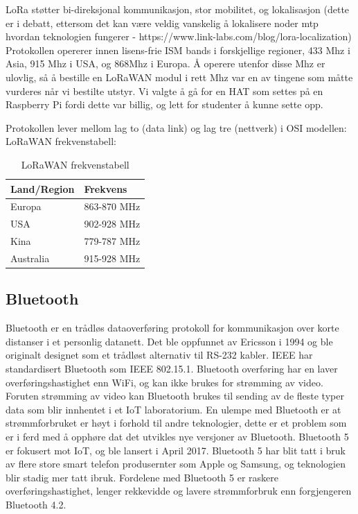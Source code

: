 \documentclass{article}
\begin{document}
LoRa støtter bi-direksjonal kommunikasjon, stor mobilitet, og lokalisasjon (dette er i debatt, ettersom det kan være veldig vanskelig å lokalisere noder mtp hvordan teknologien fungerer - https://www.link-labs.com/blog/lora-localization)
Protokollen opererer innen lisens-frie ISM bands i forskjellige regioner, 433 Mhz i Asia, 915 Mhz i USA, og 868Mhz i Europa. Å operere utenfor disse Mhz er ulovlig, så å bestille en LoRaWAN modul i rett Mhz var en av tingene som måtte vurderes når vi bestilte utstyr.  Vi valgte å gå for en HAT som settes på en Raspberry Pi fordi dette var billig, og lett for studenter å kunne sette opp.

Protokollen lever mellom lag to (data link) og lag tre (nettverk) i OSI modellen:
\\
LoRaWAN frekvenstabell:
\begin{table}[h!]
\centering
\caption{LoRaWAN frekvenstabell}
\label{lorawan-frekvenstabell}
	\begin{tabular}{|l|l|}
	\hline
		\textbf{Land/Region} &  \textbf{Frekvens}\\ \hline
		Europa &  863-870 MHz\\ \hline
		USA &  902-928 MHz\\ \hline
		Kina &  779-787 MHz\\ \hline
		Australia &  915-928 MHz\\ \hline
	\end{tabular}
\end{table}


\subsection{Bluetooth}
Bluetooth er en trådløs dataoverføring protokoll for kommunikasjon over korte distanser i et personlig datanett. Det ble oppfunnet av Ericsson i 1994 og ble originalt designet som et trådløst alternativ til RS-232 kabler. IEEE har standardisert Bluetooth som IEEE 802.15.1. Bluetooth overføring har en laver overføringshastighet enn WiFi, og kan ikke brukes for strømming av video. Foruten strømming av video kan Bluetooth brukes til sending av de fleste typer data som blir innhentet i et IoT laboratorium. En ulempe med Bluetooth er at strømmforbruket er høyt i forhold til andre teknologier, dette er et problem som er i ferd med å opphøre dat det utvikles nye versjoner av Bluetooth. Bluetooth 5 er fokusert mot IoT, og ble lansert i April 2017. Bluetooth 5 har blit tatt i bruk av flere store smart telefon produsernter som Apple og Samsung, og teknologien blir stadig mer tatt ibruk. Fordelene med Bluetooth 5  er raskere overføringshastighet, lenger rekkevidde og lavere strømmforbruk enn forgjengeren Bluetooth 4.2.
\end{document}
